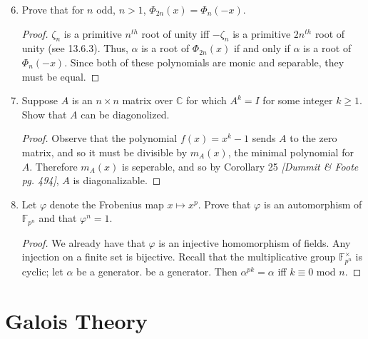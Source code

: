 \documentclass{report}
\newcommand{\C}{\mathbb{C}}
\newcommand{\F}{\mathbb{F}}
\begin{document}
\begin{enumerate}
		\setcounter{enumi}{5}
	\item Prove that for $n$ odd, $n>1$, $\Phi_{2n}(x)=\Phi_n(-x)$.
		\begin{proof}
			$\zeta_n$ is a primitive $n^{th}$ root of unity iff $-\zeta_n$ is a primitive $2n^{th}$ root of unity (see 13.6.3).
			Thus, $\alpha$ is a root of $\Phi_{2n}(x)$ if and only if $\alpha$ is a root of $\Phi_n(-x)$.
			Since both of these polynomials are monic and separable, they must be equal.
		\end{proof}
		\setcounter{enumi}{8}
	\item Suppose $A$ is an $n\times n$ matrix over $\C$ for which $A^k=I$ for some integer $k\geq 1$. Show that $A$ can be diagonolized.
		\begin{proof}
			Observe that the polynomial $f(x)=x^k-1$ sends $A$ to the zero matrix, and so it must be divisible by $m_A(x)$, the minimal polynomial for $A$. 
			Therefore $m_A(x)$ is seperable, and so by Corollary 25 \textit{[Dummit \& Foote pg. 494]}, $A$ is diagonalizable.
		\end{proof}
	\item Let $\varphi$ denote the Frobenius map $x\mapsto x^p$. Prove that $\varphi$ is an automorphism of $\F_{p^n}$ and that $\varphi^n=1$.
		\begin{proof}
			We already have that $\varphi$ is an injective homomorphism of fields. Any injection on a finite set is bijective. 
			Recall that the multiplicative group $\F_{p^n}^\times$ is cyclic; let $\alpha$ be a generator. be a generator.
			Then $\alpha^{pk}=\alpha$ iff $k\equiv 0$ mod $n$.
		\end{proof}
\end{enumerate}

\chapter{Galois Theory}
\end{document}
